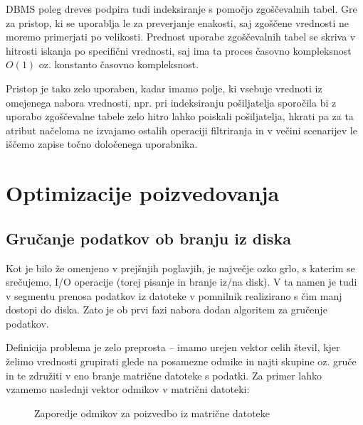 \documentclass[a4paper,12pt,openright]{book}
\begin{document}
        DBMS poleg dreves podpira tudi indeksiranje s pomočjo zgoščevalnih tabel. Gre za pristop, ki se uporablja le za preverjanje enakosti, saj zgoščene vrednosti ne moremo primerjati po velikosti.
        Prednost uporabe zgoščevalnih tabel se skriva v hitrosti iskanja po specifični vrednosti, saj ima ta proces časovno kompleksnost $O(1)$ oz. konstanto časovno kompleksnost.
        
        Pristop je tako zelo uporaben, kadar imamo polje, ki vsebuje vrednoti iz omejenega nabora vrednosti, npr. pri indeksiranju pošiljatelja sporočila bi z uporabo zgoščevalne tabele zelo hitro lahko poiskali pošiljatelja, hkrati pa za ta atribut načeloma ne izvajamo ostalih operaciji filtriranja in v večini scenarijev le iščemo zapise točno določenega uporabnika.

    \newpage
    \section{Optimizacije poizvedovanja}
        
        \subsection{Gručanje podatkov ob branju iz diska}
        
        Kot je bilo že omenjeno v prejšnjih poglavjih, je največje ozko grlo, s katerim se srečujemo, I/O operacije (torej pisanje in branje iz/na disk). V ta namen je tudi v segmentu prenosa podatkov iz datoteke v pomnilnik realizirano s čim manj dostopi do diska. Zato je ob prvi fazi nabora dodan algoritem za gručenje podatkov.

        Definicija problema je zelo preprosta – imamo urejen vektor celih števil, kjer želimo vrednosti grupirati glede na posamezne odmike in najti skupine oz. gruče in te združiti v eno branje matrične datoteke s podatki. Za primer lahko vzamemo naslednji vektor odmikov v matrični datoteki:

\hfill \break
\begin{figure}[h]
\begin{center}
\caption{Zaporedje odmikov za poizvedbo iz matrične datoteke}
\end{center}
\end{figure}
\end{document}
